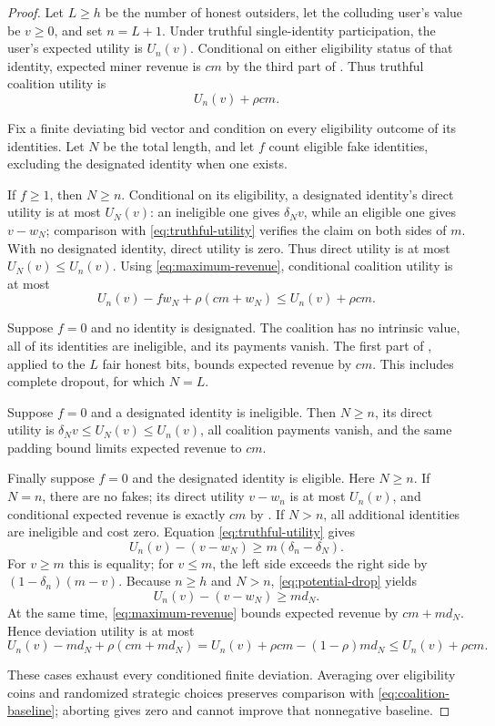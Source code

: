 \documentclass[11pt]{article}
\begin{document}
\begin{proof}
Let $L\ge h$ be the number of honest outsiders, let the colluding user's value
be $v\ge0$, and set $n=L+1$.  Under truthful single-identity participation,
the user's expected utility is $U_n(v)$.  Conditional on either eligibility
status of that identity, expected miner revenue is $cm$ by the third part of
.  Thus truthful coalition utility is
\begin{equation}
U_n(v)+\rho cm.
\label{eq:coalition-baseline}
\end{equation}

Fix a finite deviating bid vector and condition on every eligibility outcome
of its identities.  Let $N$ be the total length, and let $f$ count eligible
fake identities, excluding the designated identity when one exists.

If $f\ge1$, then $N\ge n$.  Conditional on its eligibility, a designated
identity's direct utility is at most $U_N(v)$: an ineligible one gives
$\delta_Nv$, while an eligible one gives $v-w_N$; comparison with
\eqref{eq:truthful-utility} verifies the claim on both sides of $m$.  With no
designated identity, direct utility is zero.  Thus direct utility is at most
$U_N(v)\le U_n(v)$.  Using \eqref{eq:maximum-revenue}, conditional coalition
utility is at most
\[
U_n(v)-fw_N+\rho(cm+w_N)
\le U_n(v)+\rho cm.
\]

Suppose $f=0$ and no identity is designated.  The coalition has no intrinsic
value, all of its identities are ineligible, and its payments vanish.  The
first part of , applied to the $L$ fair honest bits,
bounds expected revenue by $cm$.  This includes complete dropout, for which
$N=L$.

Suppose $f=0$ and a designated identity is ineligible.  Then $N\ge n$, its
direct utility is $\delta_Nv\le U_N(v)\le U_n(v)$, all coalition payments
vanish, and the same padding bound limits expected revenue to $cm$.

Finally suppose $f=0$ and the designated identity is eligible.  Here $N\ge n$.
If $N=n$, there are no fakes; its direct utility $v-w_n$ is at most $U_n(v)$,
and conditional expected revenue is exactly $cm$ by
.  If $N>n$, all additional identities are ineligible
and cost zero.  Equation \eqref{eq:truthful-utility} gives
\begin{equation}
U_n(v)-(v-w_N)\ge m(\delta_n-\delta_N).
\label{eq:user-potential-loss}
\end{equation}
For $v\ge m$ this is equality; for $v\le m$, the left side exceeds the right
side by $(1-\delta_n)(m-v)$.  Because $n\ge h$ and $N>n$,
\eqref{eq:potential-drop} yields
\[
U_n(v)-(v-w_N)\ge md_N.
\]
At the same time, \eqref{eq:maximum-revenue} bounds expected revenue by
$cm+md_N$.  Hence deviation utility is at most
\[
U_n(v)-md_N+\rho(cm+md_N)
=U_n(v)+\rho cm-(1-\rho)md_N
\le U_n(v)+\rho cm.
\]

These cases exhaust every conditioned finite deviation.  Averaging over
eligibility coins and randomized strategic choices preserves comparison with
\eqref{eq:coalition-baseline}; aborting gives zero and cannot improve that
nonnegative baseline.
\end{proof}
\end{document}
